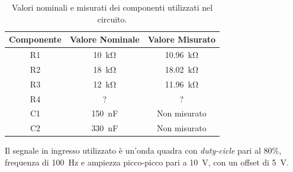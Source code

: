 \def\arraystretch{1.3}
\begin{table}[h]
	\centering
	\begin{tabular}{|c|c|c|}
		\hline
		Componente	& Valore Nominale & Valore Misurato \\ \hline
		R1 &\SI{10}{\kilo\ohm} & \SI{10,96}{\kilo\ohm} \\ \hline
		R2 &\SI{18}{\kilo\ohm} & \SI{18,02}{\kilo\ohm} \\ \hline
		R3 & \SI{12}{\kilo\ohm} & \SI{11,96}{\kilo\ohm} \\ \hline
		R4 & ? & ? \\ \hline
		C1 & \SI{150}{\nano\farad} & Non misurato \\ \hline
		C2 & \SI{330}{\nano\farad} & Non misurato \\ \hline
	\end{tabular}
	\caption{Valori nominali e misurati dei componenti utilizzati nel circuito.}
	\label{tab:valori_componenti_2}
\end{table}
Il segnale in ingresso utilizzato è un'onda quadra con \textit{duty-cicle} pari al 80\%, frequenza di \SI{100}{\hertz} e ampiezza picco-picco pari a \SI{10}{\volt}, con un offset di \SI{5}{\volt}.
